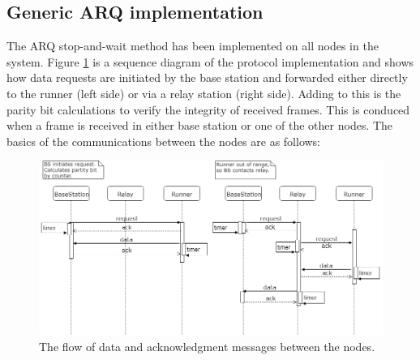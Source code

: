 \subsection{Generic ARQ implementation}\label{sc:overall}

The ARQ stop-and-wait method has been implemented on all nodes in the system. Figure \ref{fig:tohopornotarqsequence} is a sequence diagram of the  protocol implementation and shows how data requests are initiated by the base station and forwarded either directly to the runner (left side) or via a relay station (right side). Adding to this is the parity bit calculations to verify the integrity of received frames. This is conduced when a frame is received in either base station or one of the other nodes. The basics of the communications between the nodes are as follows: \\

\begin{figure}[h]
	\centering
	\includegraphics[width=1\linewidth]{implementation/overall/toHopOrNotArqSequence}
	\caption{The flow of data and acknowledgment messages between the nodes.}
	\label{fig:tohopornotarqsequence}
\end{figure}

